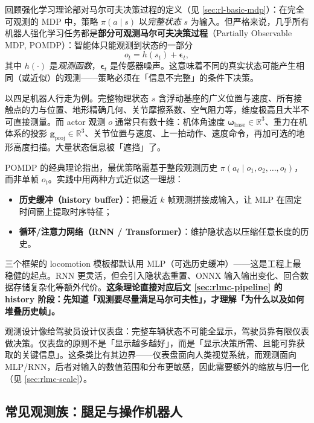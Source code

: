 回顾强化学习理论部对马尔可夫决策过程的定义（见 \cref{sec:rl-basic-mdp}）：在完全可观测的 MDP 中，策略 $\pi(a\mid s)$ 以\emph{完整状态} $s$ 为输入。但严格来说，几乎所有机器人强化学习任务都是\textbf{部分可观测马尔可夫决策过程}（Partially Observable MDP, POMDP）：智能体只能观测到状态的一部分
\begin{equation}
o_t = h(s_t) + \boldsymbol\epsilon_t,
\label{eq:rlmc-obs-fn}
\end{equation}
其中 $h(\cdot)$ 是\emph{观测函数}，$\boldsymbol\epsilon_t$ 是传感器噪声。这意味着不同的真实状态可能产生相同（或近似）的观测——策略必须在「信息不完整」的条件下决策。

以四足机器人行走为例。完整物理状态 $s$ 含浮动基座的广义位置与速度、所有接触点的力与位置、地形精确几何、关节摩擦系数、空气阻力等，维度极高且大半不可直接测量。而 actor 观测 $o$ 通常只有数十维：机体角速度 $\boldsymbol\omega_{\text{base}}\in\mathbb R^3$、重力在机体系的投影 $\mathbf g_{\text{proj}}\in\mathbb R^3$、关节位置与速度、上一拍动作、速度命令，再加可选的地形高度扫描。大量状态信息被「遮挡」了。

\begin{insight}\label{ins:rlmc-history}
POMDP 的经典理论指出，最优策略需基于整段观测历史 $\pi(a_t\mid o_1,o_2,\dots,o_t)$，而非单帧 $o_t$。实践中用两种方式近似这一理想：
\begin{itemize}
  \item \textbf{历史缓冲（history buffer）}：把最近 $k$ 帧观测拼接成输入，让 MLP 在固定时间窗上提取时序特征；
  \item \textbf{循环/注意力网络（RNN / Transformer）}：维护隐状态以压缩任意长度的历史。
\end{itemize}
三个框架的 locomotion 模板都默认用 MLP（可选历史缓冲）——这是工程上最稳健的起点。RNN 更灵活，但会引入隐状态重置、ONNX 输入输出变化、回合数据存储复杂化等额外代价。\textbf{这条理论直接对应后文 \cref{sec:rlmc-pipeline} 的 history 阶段：先知道「观测要尽量满足马尔可夫性」，才理解「为什么以及如何堆叠历史帧」。}
\end{insight}

观测设计像给驾驶员设计仪表盘：完整车辆状态不可能全显示，驾驶员靠有限仪表做决策。仪表盘的原则不是「显示越多越好」，而是「显示决策所需、且能可靠获取的关键信息」。这条类比有其边界——仪表盘面向人类视觉系统，而观测面向 MLP/RNN，后者对输入的数值范围和分布更敏感，因此需要额外的缩放与归一化（见 \cref{sec:rlmc-scale}）。

\subsection{常见观测族：腿足与操作机器人}
\label{sec:rlmc-obs-families}

